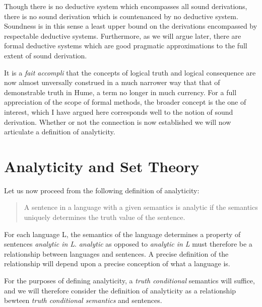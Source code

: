 \documentclass{rbjk}
\begin{document}
\begin{article}
Though there is no deductive system which encompasses all sound derivations, there is no sound derivation which is countenanced by no deductive system.
Soundness is in this sense a least upper bound on the derivations encompassed by respectable deductive systems.
Furthermore, as we will argue later, there are formal deductive systems which are good pragmatic approximations to the full extent of sound derivation.

It is a {\it fait accompli} that the concepts of logical truth and logical consequence are now almost unversally construed in a much narrower way that that of demonstrable truth in Hume, a term no longer in much currency.
For a full appreciation of the scope of formal methods, the broader concept is the one of interest, which I have argued here corresponds well to the notion of sound derivation.
Whether or not the connection is now established we will now articulate a definition of analyticity.

\section{Analyticity and Set Theory}

Let us now proceed from the following definition of analyticity:

\begin{quote}
A sentence in a language with a given semantics is analytic if the semantics uniquely determines the truth value of the sentence.
\end{quote}

For each language L, the semantics of the language determines a property of sentences {\it analytic in L}.
{\it analytic} as opposed to {\it analytic in L} must therefore be a relationship between languages and sentences.
A precise definition of the relationship will depend upon a precise conception of what a language is.

For the purposes of defining analyticity, a {\it truth conditional} semantics will suffice, and we will therefore consider the definition of analyticity as a relationship bewteen {\it truth conditional semantics} and sentences.


\end{article}
\end{document}
